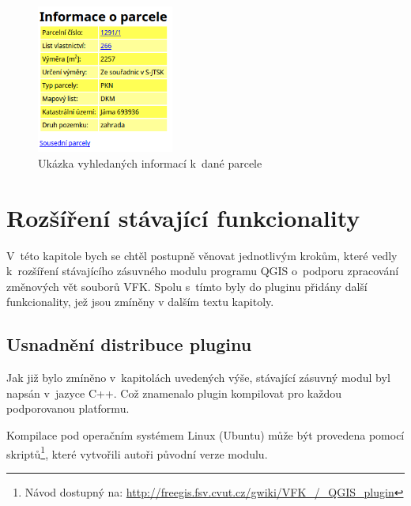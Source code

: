 \documentclass[a4paper,12pt,oneside]{book}
\begin{document}
\begin{figure}[htb]
\centering
\includegraphics[width=0.4\textwidth]{images/vfkPlugin-informace_o_parcele.png}
\caption[Ukázka vyhledaných informací k~dané parcele]{Ukázka vyhledaných informací k~dané parcele}
\label{l_informace_o_parcele}
\end{figure}



\clearpage
\chapter{Rozšíření stávající funkcionality}
\label{l_rozsireni_funkcionality}

V~této kapitole bych se chtěl postupně věnovat jednotlivým krokům,
které vedly k~rozšíření stávajícího zásuvného modulu programu QGIS
o~podporu zpracování změnových vět souborů VFK. Spolu s~tímto byly do
pluginu přidány další funkcionality, jež jsou zmíněny v dalším textu kapitoly.

\section{Usnadnění distribuce pluginu}

Jak již bylo zmíněno v~kapitolách uvedených výše, stávající zásuvný modul byl napsán v~jazyce C++. Což znamenalo plugin kompilovat pro každou podporovanou platformu.

Kompilace pod operačním systémem Linux (Ubuntu) může být provedena
pomocí skriptů\footnote{Návod dostupný na:
  \url{http://freegis.fsv.cvut.cz/gwiki/VFK\_/\_QGIS\_plugin}}, které
vytvořili autoři původní verze modulu.
\end{document}
